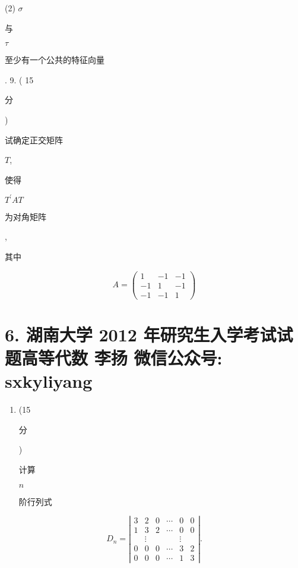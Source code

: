 \documentclass[10pt]{article}
\begin{document}
(2) $\sigma$ \begin{CJK}{UTF8}{mj}与\end{CJK} $\tau$ \begin{CJK}{UTF8}{mj}至少有一个公共的特征向量\end{CJK}. 9. ( 15 \begin{CJK}{UTF8}{mj}分\end{CJK}) \begin{CJK}{UTF8}{mj}试确定正交矩阵\end{CJK} $T$, \begin{CJK}{UTF8}{mj}使得\end{CJK} $T^{\prime} A T$ \begin{CJK}{UTF8}{mj}为对角矩阵\end{CJK}, \begin{CJK}{UTF8}{mj}其中\end{CJK}
$$
A=\left(\begin{array}{ccc}
1 & -1 & -1 \\
-1 & 1 & -1 \\
-1 & -1 & 1
\end{array}\right)
$$

\section{6. 湖南大学 2012 年研究生入学考试试题高等代数 
 李扬 
 微信公众号: sxkyliyang}
\begin{enumerate}
  \item (15 \begin{CJK}{UTF8}{mj}分\end{CJK}) \begin{CJK}{UTF8}{mj}计算\end{CJK} $n$ \begin{CJK}{UTF8}{mj}阶行列式\end{CJK}
\end{enumerate}
$$
D_{n}=\left|\begin{array}{cccccc}
3 & 2 & 0 & \cdots & 0 & 0 \\
1 & 3 & 2 & \cdots & 0 & 0 \\
& \vdots & & & \vdots & \\
0 & 0 & 0 & \cdots & 3 & 2 \\
0 & 0 & 0 & \cdots & 1 & 3
\end{array}\right| .
$$
\end{document}
